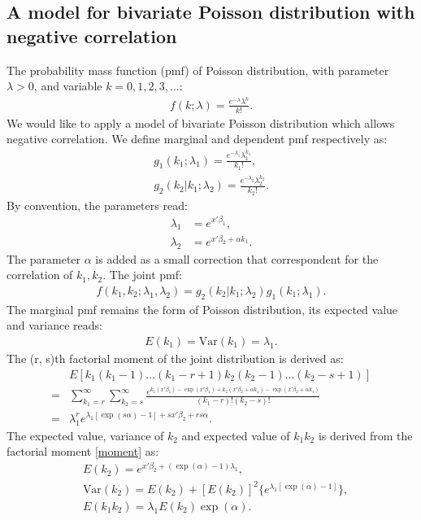 \documentclass[submission, Phys]{SciPost}
\begin{document}
\begin{appendix}
\subsection{A model for bivariate Poisson distribution with negative correlation}
The probability mass function (pmf) of Poisson distribution, with parameter $\lambda>0$, and variable $k = 0,1,2,3, ...$:
\begin{align}
f(k; \lambda)= \frac{e^{-\lambda}\lambda^k}{k!}.
\end{align}
We would like to apply a model of bivariate Poisson distribution which allows negative correlation. We define marginal and dependent pmf respectively as:
\begin{align}
g_{1}(k_{1};\lambda_1)=\frac{e^{-\lambda_{1}}\lambda_{1}^{k_{1}}}{k_{1}!},\\g_{2}(k_{2}|k_{1};\lambda_2)=\frac{e^{-\lambda_{2}}\lambda_{2}^{k_{2}}}{k_{2}!}.
\end{align}
By convention, the parameters read:
\begin{align}
\lambda_1&= e^{x'\beta_1},\\\lambda_2&=e^{x'\beta_2+\alpha k_1}.
\end{align}
The parameter $\alpha$ is added as a small correction that correspondent for the correlation of $k_1,k_2$. The joint pmf:
\begin{align}
f(k_1,k_2;\lambda_1,\lambda_2)=g_2(k_2|k_1;\lambda_2)g_1(k_1;\lambda_1). 
\end{align}
The marginal pmf remains the form of Poisson distribution, its expected value and variance reads:
\begin{align}
E(k_1)=\text{Var}(k_1)=\lambda_1.
\end{align}
The (r, s)th factorial moment of the joint distribution is derived as:
\begin{align}
&E\left[k_1(k_1-1)...(k_1-r+1)k_2(k_2-1)...(k_2-s+1)\right]\\=&\sum^{\infty}_{k_1=r}\sum^{\infty}_{k_2=s}\frac{e^{k_1(x'\beta_1)-\exp(x'\beta_1)+k_2(x'\beta_2+\alpha k_1)-\exp(x'\beta_2+\alpha k_1)}}{(k_1-r)!(k_2-s)!}\\=&\lambda_1^re^{\lambda_1[\exp(s\alpha)-1]+sx'\beta_2+rs\alpha}.\label{moment}
\end{align}
The expected value, variance of $k_2$ and expected value of $k_1k_2$ is derived from the factorial moment \ref{moment} as:
\begin{align}
&E(k_2)=e^{x'\beta_2+(\exp(\alpha)-1)\lambda_1},\\
&\text{Var}(k_2)=E(k_2)+[E(k_2)]^2\{e^{\lambda_1[\exp(\alpha)-1]}\},\\&E(k_1k_2)=\lambda_1E(k_2)\exp(\alpha).

\end{align}
\end{appendix}
\end{document}
